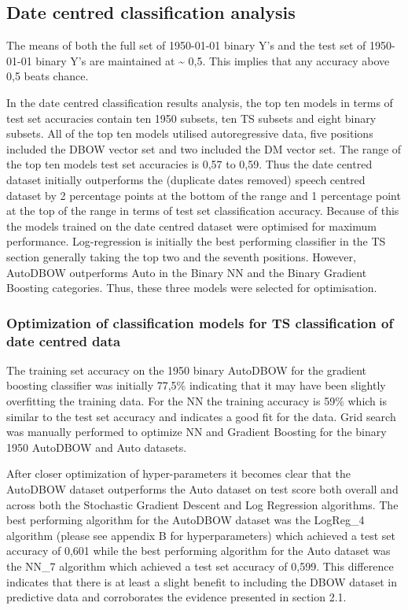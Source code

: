 \documentclass[11pt,preprint, authoryear]{elsarticle}
\numberwithin{equation}{section}
\numberwithin{figure}{section}
\numberwithin{table}{section}
\begin{document}
\hypertarget{date-centred-classification-analysis}{%
\subsection{Date centred classification
analysis}\label{date-centred-classification-analysis}}

The means of both the full set of 1950-01-01 binary Y's and the test set
of 1950-01-01 binary Y's are maintained at \textasciitilde{} 0,5. This
implies that any accuracy above 0,5 beats chance.

In the date centred classification results analysis, the top ten models
in terms of test set accuracies contain ten 1950 subsets, ten TS subsets
and eight binary subsets. All of the top ten models utilised
autoregressive data, five positions included the DBOW vector set and two
included the DM vector set. The range of the top ten models test set
accuracies is 0,57 to 0,59. Thus the date centred dataset initially
outperforms the (duplicate dates removed) speech centred dataset by 2
percentage points at the bottom of the range and 1 percentage point at
the top of the range in terms of test set classification accuracy.
Because of this the models trained on the date centred dataset were
optimised for maximum performance. Log-regression is initially the best
performing classifier in the TS section generally taking the top two and
the seventh positions. However, AutoDBOW outperforms Auto in the Binary
NN and the Binary Gradient Boosting categories. Thus, these three models
were selected for optimisation.

\hypertarget{optimization-of-classification-models-for-ts-classification-of-date-centred-data}{%
\subsubsection{Optimization of classification models for TS
classification of date centred
data}\label{optimization-of-classification-models-for-ts-classification-of-date-centred-data}}

The training set accuracy on the 1950 binary AutoDBOW for the gradient
boosting classifier was initially 77,5\% indicating that it may have
been slightly overfitting the training data. For the NN the training
accuracy is 59\% which is similar to the test set accuracy and indicates
a good fit for the data. Grid search was manually performed to optimize
NN and Gradient Boosting for the binary 1950 AutoDBOW and Auto datasets.

After closer optimization of hyper-parameters it becomes clear that the
AutoDBOW dataset outperforms the Auto dataset on test score both overall
and across both the Stochastic Gradient Descent and Log Regression
algorithms. The best performing algorithm for the AutoDBOW dataset was
the LogReg\_4 algorithm (please see appendix B for hyperparameters)
which achieved a test set accuracy of 0,601 while the best performing
algorithm for the Auto dataset was the NN\_7 algorithm which achieved a
test set accuracy of 0,599. This difference indicates that there is at
least a slight benefit to including the DBOW dataset in predictive data
and corroborates the evidence presented in section 2.1.
\end{document}
